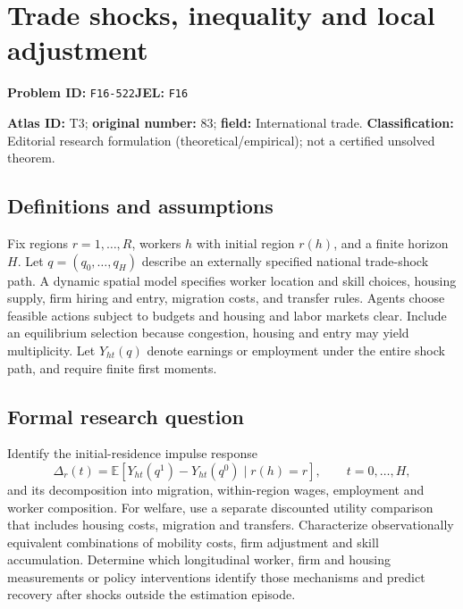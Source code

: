 \documentclass[11pt,a4paper]{article}
\begin{document}
\section*{Trade shocks, inequality and local adjustment}
\textbf{Problem ID:} \texttt{F16-522}\quad \textbf{JEL:} \texttt{F16}\par
\label{problem:OP-0083}
\label{atlas:prob:T3}

\noindent\textbf{Atlas ID:} T3; \textbf{original number:} 83; \textbf{field:} International trade. \textbf{Classification:} Editorial research formulation (theoretical/empirical); not a certified unsolved theorem.

\subsection*{Definitions and assumptions}
Fix regions $r=1,\ldots,R$, workers $h$ with initial region $r(h)$, and a finite horizon $H$. Let $q=(q_0,\ldots,q_H)$ describe an externally specified national trade-shock path. A dynamic spatial model specifies worker location and skill choices, housing supply, firm hiring and entry, migration costs, and transfer rules. Agents choose feasible actions subject to budgets and housing and labor markets clear. Include an equilibrium selection because congestion, housing and entry may yield multiplicity. Let $Y_{ht}(q)$ denote earnings or employment under the entire shock path, and require finite first moments.

\subsection*{Formal research question}
Identify the initial-residence impulse response
\[
 \Delta_r(t)=\mathbb E[Y_{ht}(q^1)-Y_{ht}(q^0)\mid r(h)=r],
 \qquad t=0,\ldots,H,
\]
and its decomposition into migration, within-region wages, employment and worker composition. For welfare, use a separate discounted utility comparison that includes housing costs, migration and transfers. Characterize observationally equivalent combinations of mobility costs, firm adjustment and skill accumulation. Determine which longitudinal worker, firm and housing measurements or policy interventions identify those mechanisms and predict recovery after shocks outside the estimation episode.
\end{document}
